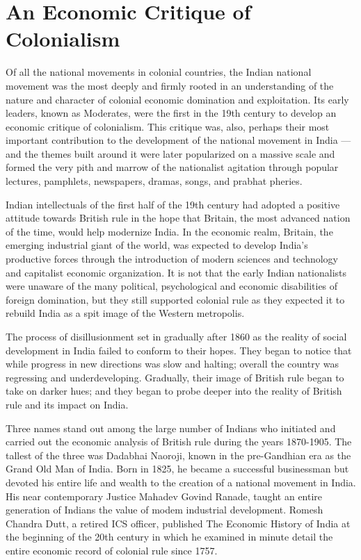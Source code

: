 \cleardoublepage
\chapter{An Economic Critique of Colonialism}

Of all the national movements in colonial countries, the Indian national movement was the most deeply and firmly rooted in an understanding of the nature and character of colonial economic domination and exploitation. Its early leaders, known as Moderates, were the first in the 19th century to develop an economic critique of colonialism. This critique was, also, perhaps their most important contribution to the development of the national movement in India — and the themes built around it were later popularized on a massive scale and formed the very pith and marrow of the nationalist agitation through popular lectures, pamphlets, newspapers, dramas, songs, and prabhat pheries.

Indian intellectuals of the first half of the 19th century had adopted a positive attitude towards British rule in the hope that Britain, the most advanced nation of the time, would help modernize India. In the economic realm, Britain, the emerging industrial giant of the world, was expected to develop India's productive forces through the introduction of modern sciences and technology and capitalist economic organization. It is not that the early Indian nationalists were unaware of the many political, psychological and economic disabilities of foreign domination, but they still supported colonial rule as they expected it to rebuild India as a spit image of the Western metropolis.

The process of disillusionment set in gradually after 1860 as the reality of social development in India failed to conform to their hopes. They began to notice that while progress in new directions was slow and halting; overall the country was regressing and underdeveloping. Gradually, their image of British rule began to take on darker hues; and they began to probe deeper into the reality of British rule and its impact on India.

Three names stand out among the large number of Indians who initiated and carried out the economic analysis of British rule during the years 1870-1905. The tallest of the three was Dadabhai Naoroji, known in the pre-Gandhian era as the Grand Old Man of India. Born in 1825, he became a successful businessman but devoted his entire life and wealth to the creation of a national movement in India. His near contemporary Justice Mahadev Govind Ranade, taught an entire generation of Indians the value of modem industrial development. Romesh Chandra Dutt, a retired ICS officer, published The Economic History of India at the beginning of the 20th century in which he examined in minute detail the entire economic record of colonial rule since 1757.

